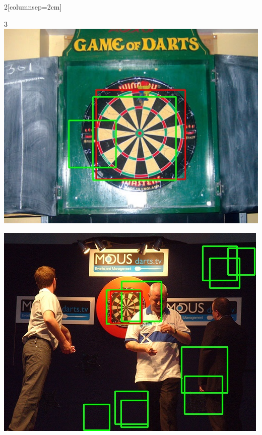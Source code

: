 \documentclass{article}
\begin{document}
\begin{multicols}{2}[columnsep=2cm]
\begin{multicols}{3}
    \includegraphics[width=\linewidth]{dart1-dart.jpg}\par
    \includegraphics[width=\linewidth]{dart6-dart.jpg}\par

\end{multicols}
\end{multicols}
\end{document}
